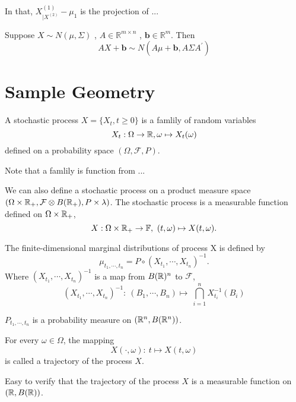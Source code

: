\documentclass[12pt]{book}
\begin{document}
\begin{remark}
In that, $X^{(1)}_{|X^{(2)}}-\mu_1$ is the projection of ...
\end{remark}








\begin{theorem}
Suppose $X \sim N(\mathbb \mu,\Sigma)$ , $A \in \mathbb{R}^{m \times n}$	, $\mathbf{b} \in \mathbb{R}^m$. Then 
$$
AX+\mathbf{b} \sim N(A\mu+\mathbf{b},A \Sigma A^\prime)
$$

\end{theorem}

\section{Sample Geometry}



\begin{definition}
A stochastic process $X = \{X_t, t \geq 0\}$ is a famlily of random variables 
$$
X_t: \Omega \to \mathbb{R}, \omega \mapsto X_t(\omega)
$$
defined on a probability space $(\Omega,\mathcal{F},P)$.
\end{definition}
Note that a famlily is function from ...




\begin{definition}
We can also define a stochastic process on a product measure space $(\Omega \times \mathbb{R}_+, \mathcal F \otimes B(\mathbb{R}_+), P\times \lambda)$.
The stochastic process is a measurable function defined on $\Omega \times \mathbb{R}_+$,
$$
X: \Omega \times \mathbb{R}_+ \to \mathbb{F}, \ (t,\omega) \mapsto X(t,\omega).
$$
	
\end{definition}


\begin{definition}
The finite-dimensional marginal distributions of process X is defined by 
$$
\mu_{t_1,\cdots,t_n} = P \circ (X_{t_1},\cdots,X_{t_n})^{-1}.
$$	
Where $(X_{t_1},\cdots,X_{t_n})^{-1}$  is a map from $B(\mathbb{R})^n$ to $\mathcal F$,
$$
(X_{t_1},\cdots,X_{t_n})^{-1}: \ (B_1,\cdots,B_n) \mapsto \ \bigcap_{i=1}^n X_{t_i}^{-1}(B_i)
$$
\end{definition}

\begin{theorem}
$P_{t_1,\cdots,t_n}$ is a probability measure on $(\mathbb{R}^n,B(\mathbb{R}^n))$.
\end{theorem}

\begin{definition}
For every $\omega \in \Omega$, the mapping 
$$
X(\cdot,\omega):\ t \mapsto X(t,\omega)
$$
is called a trajectory of the process $X$.
\end{definition}
\begin{remark}
Easy to verify that the trajectory of the process $X$ is a measurable function on $(\mathbb{R},B(\mathbb{R}))$. 
\end{remark}
\end{document}
